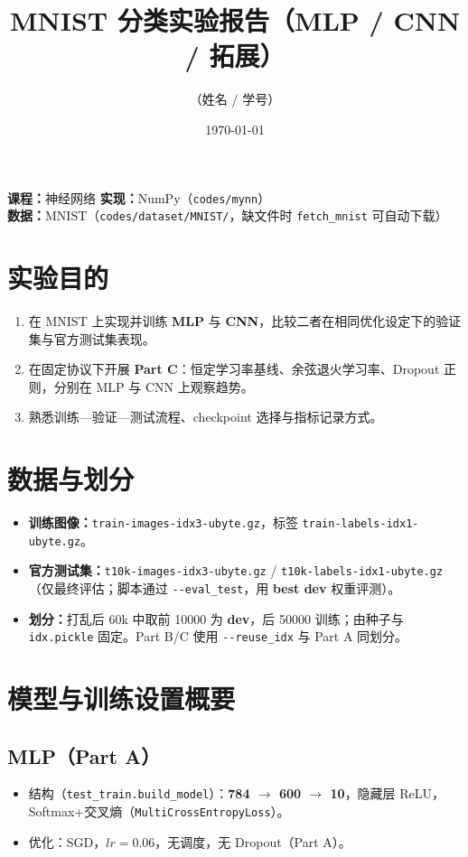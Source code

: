 \documentclass[UTF8,a4paper]{ctexart}
\title{MNIST 分类实验报告（MLP / CNN / 拓展）}
\author{（姓名 / 学号）}
\date{\today}
\begin{document}
\maketitle

\noindent\textbf{课程：}神经网络 \quad \textbf{实现：}NumPy（\texttt{codes/mynn}）\\
\textbf{数据：}MNIST（\texttt{codes/dataset/MNIST/}，缺文件时 \texttt{fetch\_mnist} 可自动下载）

\section{实验目的}
\begin{enumerate}
  \item 在 MNIST 上实现并训练 \textbf{MLP} 与 \textbf{CNN}，比较二者在相同优化设定下的验证集与官方测试集表现。
  \item 在固定协议下开展 \textbf{Part C}：恒定学习率基线、余弦退火学习率、Dropout 正则，分别在 MLP 与 CNN 上观察趋势。
  \item 熟悉训练—验证—测试流程、checkpoint 选择与指标记录方式。
\end{enumerate}

\section{数据与划分}
\begin{itemize}
  \item \textbf{训练图像：}\texttt{train-images-idx3-ubyte.gz}，标签 \texttt{train-labels-idx1-ubyte.gz}。
  \item \textbf{官方测试集：}\texttt{t10k-images-idx3-ubyte.gz} / \texttt{t10k-labels-idx1-ubyte.gz}（仅最终评估；脚本通过 \texttt{-{}-eval\_test}，用 \textbf{best dev} 权重评测）。
  \item \textbf{划分：}打乱后 60k 中取前 10000 为 \textbf{dev}，后 50000 训练；由种子与 \texttt{idx.pickle} 固定。Part B/C 使用 \texttt{-{}-reuse\_idx} 与 Part A 同划分。
\end{itemize}

\section{模型与训练设置概要}

\subsection{MLP（Part A）}
\begin{itemize}
  \item 结构（\texttt{test\_train.build\_model}）：\textbf{784 $\to$ 600 $\to$ 10}，隐藏层 ReLU，Softmax+交叉熵（\texttt{MultiCrossEntropyLoss}）。
  \item 优化：SGD，$lr=0.06$，无调度，无 Dropout（Part A）。
\end{itemize}
\end{document}
